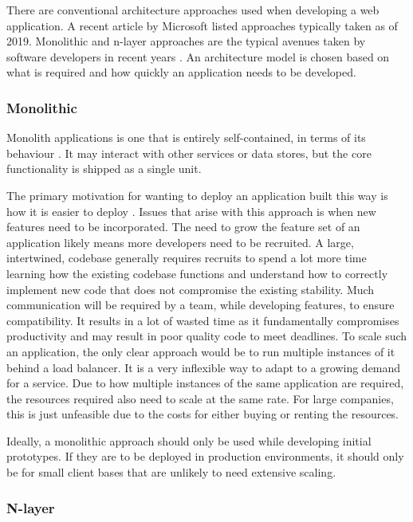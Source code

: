 There are conventional architecture approaches used when developing a web application.
A recent article by Microsoft listed approaches typically taken as of 2019. 
Monolithic and n-layer approaches are the typical avenues taken by software developers in recent years \cite{ardalis_common}.
An architecture model is chosen based on what is required and how quickly an application needs to be developed.

\subsubsection{Monolithic} \label{monolithic}
Monolith applications is one that is entirely self-contained, in terms of its behaviour \cite{ardalis_common}.
It may interact with other services or data stores, but the core functionality is shipped as a single unit.

The primary motivation for wanting to deploy an application built this way is how it is easier to deploy \cite{namiot2014micro}.
Issues that arise with this approach is when new features need to be incorporated. The need to grow the feature set of an application likely means
more developers need to be recruited. A large, intertwined, codebase generally requires recruits to spend a lot more time learning
how the existing codebase functions and understand how to correctly implement new code that does not compromise the existing stability.
Much communication will be required by a team, while developing features, to ensure compatibility.
It results in a lot of wasted time as it fundamentally compromises productivity and may result in poor quality code to meet deadlines.
To scale such an application, the only clear approach would be to run multiple instances of it behind a load balancer.
It is a very inflexible way to adapt to a growing demand for a service.
Due to how multiple instances of the same application are required, the resources required also need to scale at the same rate.
For large companies, this is just unfeasible due to the costs for either buying or renting the resources. 

Ideally, a monolithic approach should only be used while developing initial prototypes. If they are to be deployed in production environments,
it should only be for small client bases that are unlikely to need extensive scaling.

\subsubsection{N-layer} \label{nlayer}

